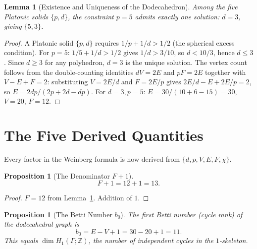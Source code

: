 \documentclass[11pt,a4paper]{article}
\theoremstyle{plain}
\newtheorem{lemma}[theorem]{Lemma}
\newtheorem{proposition}[theorem]{Proposition}
\theoremstyle{definition}
\newcommand{\Z}{\mathbb{Z}}
\begin{document}
\begin{lemma}[Existence and Uniqueness of the Dodecahedron]\label{lem:dodec}
Among the five Platonic solids $\{p,d\}$, the constraint $p = 5$ admits
exactly one solution: $d = 3$, giving $\{5,3\}$.
\end{lemma}

\begin{proof}
A Platonic solid $\{p,d\}$ requires $1/p + 1/d > 1/2$
(the spherical excess condition).  For $p = 5$: $1/5 + 1/d > 1/2$
gives $1/d > 3/10$, so $d < 10/3$, hence $d \le 3$.  Since
$d \ge 3$ for any polyhedron, $d = 3$ is the unique solution.
The vertex count follows from the double-counting identities
$dV = 2E$ and $pF = 2E$ together with $V - E + F = 2$:
substituting $V = 2E/d$ and $F = 2E/p$ gives
$2E/d - E + 2E/p = 2$, so $E = 2dp/(2p + 2d - dp)$.
For $d = 3, p = 5$: $E = 30/(10 + 6 - 15) = 30$, $V = 20$, $F = 12$.
\end{proof}

\section{The Five Derived Quantities}\label{sec:derived}

Every factor in the Weinberg formula is now derived from $\{d, p, V, E, F, \chi\}$.

\begin{proposition}[The Denominator $F + 1$]\label{prop:f-plus-1}
\begin{equation}\label{eq:f-plus-1}
  F + 1 = 12 + 1 = 13.
\end{equation}
\end{proposition}

\begin{proof}
$F = 12$ from Lemma~\ref{lem:dodec}.  Addition of $1$.
\end{proof}

\begin{proposition}[The Betti Number $b_{0}$]\label{prop:betti}
The first Betti number (cycle rank) of the dodecahedral graph is
\begin{equation}\label{eq:betti}
  b_{0} = E - V + 1 = 30 - 20 + 1 = 11.
\end{equation}
This equals $\dim H_{1}(\Gamma;\Z)$, the number of independent cycles
in the $1$-skeleton.
\end{proposition}
\end{document}
